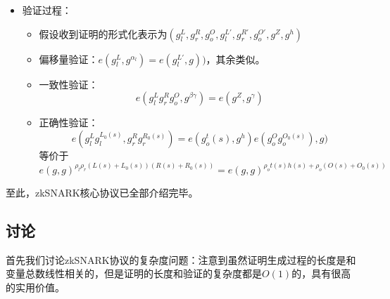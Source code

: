 \documentclass[12pt]{article}
\newcommand{\zk}{zkSNARK}
\begin{document}
\begin{itemize}
\begin{itemize}
	\end{itemize}
	\item 验证过程：
	\begin{itemize}
		\item 假设收到证明的形式化表示为$(g_l^L,g_r^R,g_o^O,g_l^{L'},g_r^{R'},g_o^{O'},g^Z,g^h)$
		\item  偏移量验证：$e(g_l^L,g^{\alpha_l})=e(g_l^{L'},g))$，其余类似。
		\item 一致性验证：
		$$e(g_l^Lg_r^Rg_o^O,g^{\beta\gamma})=e(g^Z,g^{\gamma})$$
		\item 正确性验证：
		$$e(g_l^Lg_l^{L_0(s)},g_r^Rg_r^{R_0(s)})=e(g_o^t(s),g^h)e(g_o^Og_o^{O_0(s)}),g)$$
		等价于
		$$ e(g,g)^{\rho_l\rho_r(L(s)+L_0(s))(R(s)+R_0(s))}=e(g,g)^{\rho_ot(s)h(s)+\rho_o(O(s)+O_0(s))}$$
	\end{itemize}
\end{itemize}
至此，\zk 核心协议已全部介绍完毕。
\subsection{讨论}
首先我们讨论\zk 协议的复杂度问题：注意到虽然证明生成过程的长度是和变量总数线性相关的，但是证明的长度和验证的复杂度都是$O(1)$的，具有很高的实用价值。
\end{document}
